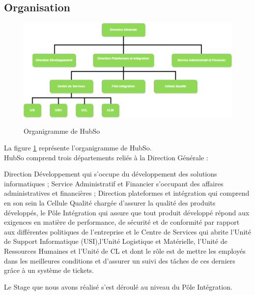 \subsection{Organisation}
\begin{figure}[h!]
	\centering
	\begin{minipage}{18cm}
		\centering
		{\includegraphics[height=0.27\textheight]{fig/Organnigramme-HubSo.png}}
	\end{minipage}
 	\caption{Organigramme de HubSo}
 	\label{fig:1.1}
\end{figure}
La figure \ref{fig:1.1} représente l'organigramme de HubSo. \\
HubSo comprend trois départements reliés à la Direction Générale : 
\begin{itemize}
	\itemcheck Direction Développement qui s'occupe du développement des solutions informatiques ; 
	\itemcheck Service Administratif et Financier s'occupant des affaires administratives et financières ;
	\itemcheck Direction plateformes et intégration qui comprend en son sein la Cellule Qualité chargée d'assurer la qualité des produits développés, le Pôle Intégration qui assure que tout produit développé répond aux exigences en matière de performance, de sécurité et de conformité par rapport aux différentes politiques de l'entreprise et le Centre de Services qui abrite l'Unité de Support Informatique (USI),l'Unité Logistique et Matérielle, l'Unité de Ressources Humaines et l'Unité de CL et dont le rôle est de mettre les employés dans les meilleures conditions et d'assurer un suivi des tâches de ces derniers grâce à un système de tickets.
\end{itemize}
Le Stage que nous avons réalisé s'est déroulé au niveau du Pôle Intégration.